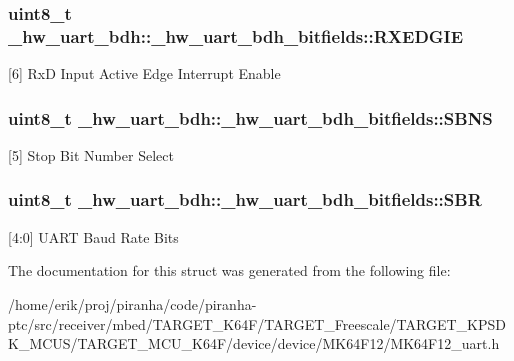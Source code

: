 \subsubsection[{\texorpdfstring{R\+X\+E\+D\+G\+IE}{RXEDGIE}}]{\setlength{\rightskip}{0pt plus 5cm}uint8\+\_\+t \+\_\+hw\+\_\+uart\+\_\+bdh\+::\+\_\+hw\+\_\+uart\+\_\+bdh\+\_\+bitfields\+::\+R\+X\+E\+D\+G\+IE}\hypertarget{struct__hw__uart__bdh_1_1__hw__uart__bdh__bitfields_a7012b6f1b0f6bf33a07e4454cbb6a01f}{}\label{struct__hw__uart__bdh_1_1__hw__uart__bdh__bitfields_a7012b6f1b0f6bf33a07e4454cbb6a01f}
\mbox{[}6\mbox{]} RxD Input Active Edge Interrupt Enable 
\subsubsection[{\texorpdfstring{S\+B\+NS}{SBNS}}]{\setlength{\rightskip}{0pt plus 5cm}uint8\+\_\+t \+\_\+hw\+\_\+uart\+\_\+bdh\+::\+\_\+hw\+\_\+uart\+\_\+bdh\+\_\+bitfields\+::\+S\+B\+NS}\hypertarget{struct__hw__uart__bdh_1_1__hw__uart__bdh__bitfields_a07344458bdf443f3fa8b9f75d1e415f3}{}\label{struct__hw__uart__bdh_1_1__hw__uart__bdh__bitfields_a07344458bdf443f3fa8b9f75d1e415f3}
\mbox{[}5\mbox{]} Stop Bit Number Select 
\subsubsection[{\texorpdfstring{S\+BR}{SBR}}]{\setlength{\rightskip}{0pt plus 5cm}uint8\+\_\+t \+\_\+hw\+\_\+uart\+\_\+bdh\+::\+\_\+hw\+\_\+uart\+\_\+bdh\+\_\+bitfields\+::\+S\+BR}\hypertarget{struct__hw__uart__bdh_1_1__hw__uart__bdh__bitfields_a59c3df1a48f979d34aa83cc9af8e18c4}{}\label{struct__hw__uart__bdh_1_1__hw__uart__bdh__bitfields_a59c3df1a48f979d34aa83cc9af8e18c4}
\mbox{[}4\+:0\mbox{]} U\+A\+RT Baud Rate Bits 

The documentation for this struct was generated from the following file\+:\begin{DoxyCompactItemize}
\item 
/home/erik/proj/piranha/code/piranha-\/ptc/src/receiver/mbed/\+T\+A\+R\+G\+E\+T\+\_\+\+K64\+F/\+T\+A\+R\+G\+E\+T\+\_\+\+Freescale/\+T\+A\+R\+G\+E\+T\+\_\+\+K\+P\+S\+D\+K\+\_\+\+M\+C\+U\+S/\+T\+A\+R\+G\+E\+T\+\_\+\+M\+C\+U\+\_\+\+K64\+F/device/device/\+M\+K64\+F12/M\+K64\+F12\+\_\+uart.\+h\end{DoxyCompactItemize}
